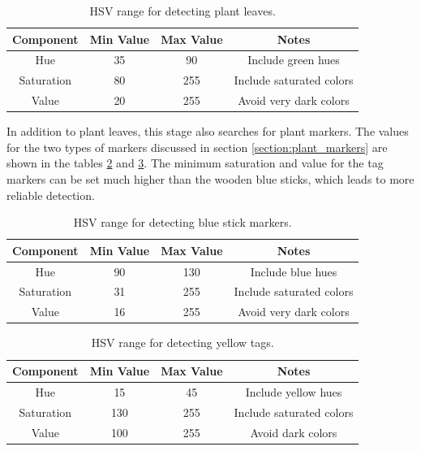 \begin{table}
    \begin{center}
    \caption[Plant leaf detection values]{HSV range for detecting plant leaves.}
    \begin{tabular}[c]{|c|c|c|c|}
        \hline
        Component & Min Value & Max Value & Notes \\
        \hline
        Hue        & 35  & 90  & Include green hues        \\
        Saturation & 80  & 255 & Include saturated colors  \\
        Value      & 20  & 255 & Avoid very dark colors    \\
        \hline
    \end{tabular}
    \label{table:plant_leaves_hsv_ranges}
   \end{center}
\end{table}

In addition to plant leaves, this stage also searches for plant markers.  The values for the two types of markers discussed in section \ref{section:plant_markers} are shown in the tables \ref{table:stick_hsv_ranges} and \ref{table:tag_ranges}.  The minimum saturation and value for the tag markers can be set much higher than the wooden blue sticks, which leads to more reliable detection.   

\begin{table}
    \begin{center}
    \caption[Blue stick detection values]{HSV range for detecting blue stick markers.}
    \begin{tabular}[c]{|c|c|c|c|}
        \hline
        Component & Min Value & Max Value & Notes \\
        \hline
        Hue        & 90  & 130 & Include blue hues        \\
        Saturation & 31  & 255 & Include saturated colors  \\
        Value      & 16  & 255 & Avoid very dark colors    \\
        \hline
    \end{tabular}
    \label{table:stick_hsv_ranges}
   \end{center}
\end{table}

\begin{table}
    \begin{center}
    \caption[Yellow tags detection values]{HSV range for detecting yellow tags.}
    \begin{tabular}[c]{|c|c|c|c|}
        \hline
        Component & Min Value & Max Value & Notes \\
        \hline
        Hue        & 15  & 45  & Include yellow hues       \\
        Saturation & 130 & 255 & Include saturated colors  \\
        Value      & 100 & 255 & Avoid dark colors         \\
        \hline
    \end{tabular}
    \label{table:tag_ranges}
   \end{center}
\end{table}


